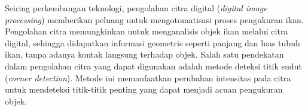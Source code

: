 Seiring perkembangan teknologi, pengolahan citra digital (\emph{digital image processing}) memberikan peluang untuk mengotomatisasi proses pengukuran ikan.
Pengolahan citra memungkinkan untuk menganalisis objek ikan melalui citra digital, sehingga didapatkan informasi geometris seperti panjang dan luas tubuh ikan, tanpa adanya kontak langsung terhadap objek.
Salah satu pendekatan dalam pengolahan citra yang dapat digunakan adalah metode deteksi titik sudut (\emph{corner detection}). Metode ini memanfaatkan perubahan intensitas pada citra untuk mendeteksi titik-titik penting yang dapat menjadi acuan pengukuran objek. 

